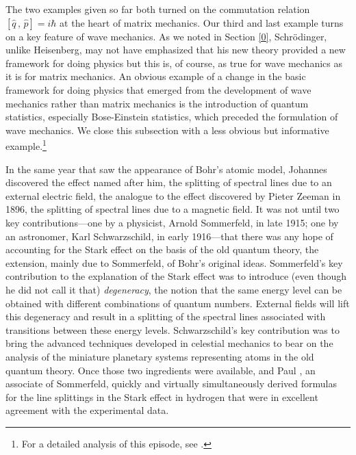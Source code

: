 The two examples given so far both turned on the commutation relation  $[\hat{q} \, , \, \hat{p}] = i\hbar$ at the heart of matrix mechanics. Our third and last example turns on a key feature of wave mechanics. As we noted in Section \ref{0}, Schr\"odinger, unlike Heisenberg, may not have emphasized that his new theory provided a new framework for doing physics but  this is, of course,  as true for wave mechanics as it is for matrix mechanics. An obvious example of a change in the basic framework for doing physics that emerged from the development of wave mechanics rather than matrix mechanics is the introduction of quantum statistics, especially Bose-Einstein statistics, which preceded the formulation of wave mechanics. We close this subsection with a less obvious but informative example.\footnote{For a detailed analysis of this episode, see \citet[Sec.\ 6.3 and Appendix A]{Duncan and Janssen 2014, Duncan and Janssen 2015, Duncan and Janssen 2019}.}

In the same year that saw the appearance of Bohr's atomic model, Johannes \citet{Stark 1913} discovered the effect named after him, the splitting of spectral lines due to an external electric field, the analogue to the effect discovered by Pieter Zeeman in 1896, the splitting of spectral lines due to a magnetic field. It was not until two key contributions---one by a physicist, Arnold Sommerfeld, in late 1915; one by an astronomer, Karl Schwarzschild, in early 1916---that there was any hope of accounting for the Stark effect on the basis of the old quantum theory, the extension, mainly due to Sommerfeld, of Bohr's original ideas. Sommerfeld's key contribution to the explanation of the Stark effect was to introduce (even though he did not call it that) \emph{degeneracy}, the notion that the same energy level can be obtained with different combinations of quantum numbers. External fields will lift this degeneracy and result in a splitting of the spectral lines associated with transitions between these energy levels. Schwarzschild's key contribution was to bring the advanced techniques developed in celestial mechanics to bear on the analysis of the miniature planetary systems representing atoms in the old quantum theory.  Once those two ingredients were available, \citet{Schwarzschild 1916} and Paul \citet{Epstein 1916}, an associate of Sommerfeld, quickly and virtually simultaneously derived formulas for the line splittings in the Stark effect in hydrogen that were in excellent agreement with the experimental data.  

